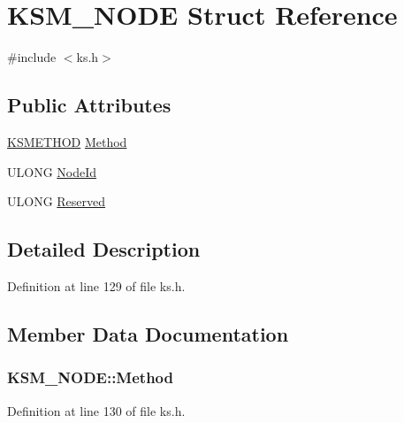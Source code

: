 \hypertarget{struct_k_s_m___n_o_d_e}{}\section{K\+S\+M\+\_\+\+N\+O\+DE Struct Reference}
\label{struct_k_s_m___n_o_d_e}


{\ttfamily \#include $<$ks.\+h$>$}

\subsection*{Public Attributes}
\begin{DoxyCompactItemize}
\item 
\hyperlink{ks_8h_a2dd13d5f1d3cae686d60262dd39031a0}{K\+S\+M\+E\+T\+H\+OD} \hyperlink{struct_k_s_m___n_o_d_e_a82d0631a7e94855367966d684ad7df16}{Method}
\item 
U\+L\+O\+NG \hyperlink{struct_k_s_m___n_o_d_e_ad4075ab07102225a1123b99d483be1ce}{Node\+Id}
\item 
U\+L\+O\+NG \hyperlink{struct_k_s_m___n_o_d_e_ae9a6d3699f348593bc319372ca98e79f}{Reserved}
\end{DoxyCompactItemize}


\subsection{Detailed Description}


Definition at line 129 of file ks.\+h.



\subsection{Member Data Documentation}
\subsubsection[{\texorpdfstring{Method}{Method}}]{ K\+S\+M\+\_\+\+N\+O\+D\+E\+::\+Method}\hypertarget{struct_k_s_m___n_o_d_e_a82d0631a7e94855367966d684ad7df16}{}\label{struct_k_s_m___n_o_d_e_a82d0631a7e94855367966d684ad7df16}


Definition at line 130 of file ks.\+h.

